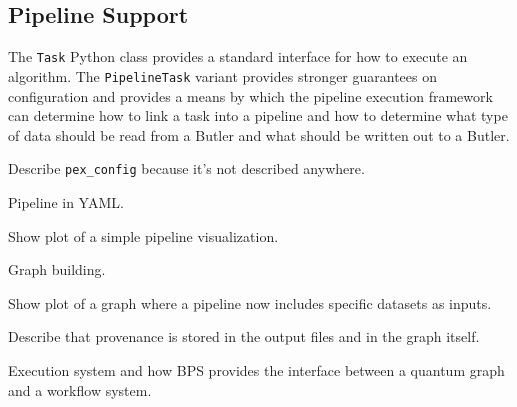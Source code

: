 \subsection{Pipeline Support}

The \texttt{Task} Python class provides a standard interface for how to execute an algorithm.
The \texttt{PipelineTask} variant provides stronger guarantees on configuration and provides a means by which the pipeline execution framework can determine how to link a task into a pipeline and how to determine what type of data should be read from a Butler and what should be written out to a Butler.

Describe \texttt{pex\_config} because it's not described anywhere.

Pipeline in YAML.

Show plot of a simple pipeline visualization.

Graph building.

Show plot of a graph where a pipeline now includes specific datasets as inputs.

Describe that provenance is stored in the output files and in the graph itself.

Execution system and how BPS provides the interface between a quantum graph and a workflow system.
